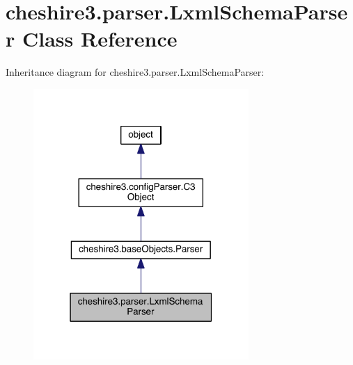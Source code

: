 \hypertarget{classcheshire3_1_1parser_1_1_lxml_schema_parser}{\section{cheshire3.\-parser.\-Lxml\-Schema\-Parser Class Reference}
\label{classcheshire3_1_1parser_1_1_lxml_schema_parser}
}


Inheritance diagram for cheshire3.\-parser.\-Lxml\-Schema\-Parser\-:
\nopagebreak
\begin{figure}[H]
\begin{center}
\leavevmode
\includegraphics[width=232pt]{classcheshire3_1_1parser_1_1_lxml_schema_parser__inherit__graph}
\end{center}
\end{figure}


